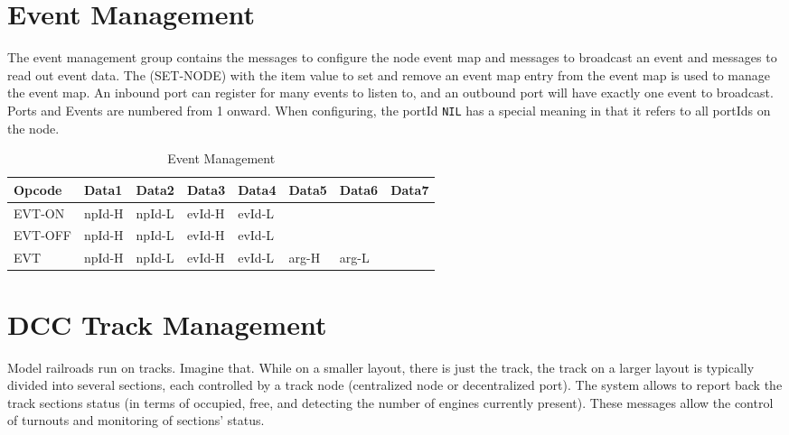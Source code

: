 \section{Event Management}

The event management group contains the messages to configure the node event map and messages to broadcast an event and messages to read out event data. The (SET-NODE) with the item value to set and remove an event map entry from the event map is used to manage the event map. An inbound port can register for many events to listen to, and an outbound port will have exactly one event to broadcast. Ports and Events are numbered from 1 onward. When configuring, the portId \texttt{NIL} has a special meaning in that it refers to all portIds on the node.

\begin{table}[ht!]
    \begin{center}
        \caption{Event Management}
        \begin{tabular}{|l|l|l|l|l|l|l|l|}
            \toprule
            \textbf{Opcode} & \textbf{Data1} & \textbf{Data2} & \textbf{Data3} & \textbf{Data4} & \textbf{Data5} & \textbf{Data6} & \textbf{Data7} \\
            \midrule
            EVT-ON & npId-H & npId-L & evId-H & evId-L & & & \\
            EVT-OFF & npId-H & npId-L & evId-H & evId-L & & & \\
            EVT & npId-H & npId-L & evId-H & evId-L & arg-H & arg-L & \\
            \bottomrule
        \end{tabular}
    \end{center}
\end{table}

\section{DCC Track Management}

Model railroads run on tracks. Imagine that. While on a smaller layout, there is just the track, the track on a larger layout is typically divided into several sections, each controlled by a track node \textnormal{(centralized node or decentralized port)}. The system allows to report back the track sections status \textnormal{(in terms of occupied, free, and detecting the number of engines currently present)}. These messages allow the control of turnouts and monitoring of sections' status.

